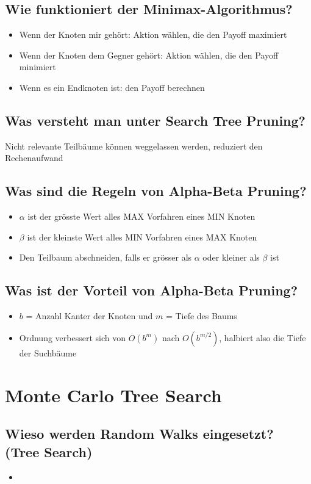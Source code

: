 \documentclass[a4paper]{article}
\begin{document}
		\subsection{Wie funktioniert der Minimax-Algorithmus?}
		
		\begin{itemize}
			\item Wenn der Knoten mir gehört: Aktion wählen, die den Payoff maximiert
			\item Wenn der Knoten dem Gegner gehört: Aktion wählen, die den Payoff minimiert
			\item Wenn es ein Endknoten ist: den Payoff berechnen
		\end{itemize}
	
		\subsection{Was versteht man unter Search Tree Pruning?}
		
		Nicht relevante Teilbäume können weggelassen werden, reduziert den Rechenaufwand
		
		\subsection{Was sind die Regeln von Alpha-Beta Pruning?}
		
		\begin{itemize}
			\item $\alpha$ ist der grösste Wert alles MAX Vorfahren eines MIN Knoten
			\item $\beta$ ist der kleinste Wert alles MIN Vorfahren eines MAX Knoten
			\item Den Teilbaum abschneiden, falls er grösser als $\alpha$ oder kleiner als $\beta$ ist
		\end{itemize}
		
		\subsection{Was ist der Vorteil von Alpha-Beta Pruning?}
		
		\begin{itemize}
			\item $b$ = Anzahl Kanter der Knoten und $m$ = Tiefe des Baums
			\item Ordnung verbessert sich von $O(b^{m})$ nach $O(b^{m/2})$, halbiert also die Tiefe der Suchbäume
		\end{itemize}
	
	\section{Monte Carlo Tree Search}
	
		\subsection{Wieso werden Random Walks eingesetzt? (Tree Search)}
		
		\begin{itemize}
			\item 
		\end{itemize}
		
		
	
\end{document}

